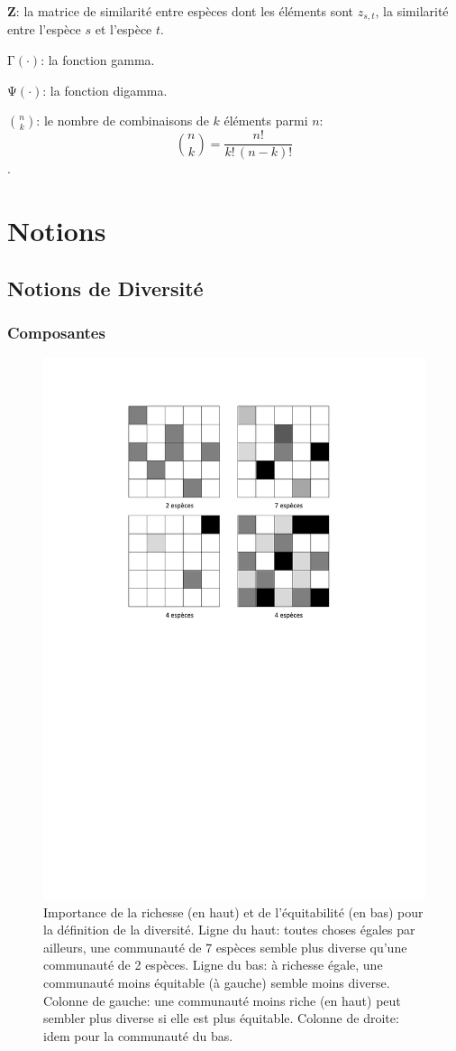 \documentclass[
  11pt,
  french,
  a4paper,
  extrafontsizes,onecolumn,openright
  ]{memoir}
\begin{document}
\noindent \(\mathbf{Z}\): la matrice de similarité entre espèces dont les éléments sont \(z_{s,t}\), la similarité entre l'espèce \(s\) et l'espèce \(t\).

\noindent \(\mathrm{\Gamma}(\cdot)\): la fonction gamma.

\noindent \(\mathrm{\Psi}(\cdot)\): la fonction digamma.

\noindent \(\binom{n}{k}\): le nombre de combinaisons de \(k\) éléments parmi \(n\): \[\binom{n}{k}=\frac{n!}{k!\,(n-k)!}\].

\mainmatter

\part{Notions}\label{part-notions}

\chapter{Notions de Diversité}\label{chap-Notions}

\section{Composantes}\label{composantes}



\scriptsize

\begin{figure}

{\centering \includegraphics[width=0.6\linewidth]{images/Composantes} 

}

\caption{Importance de la richesse (en haut) et de l'équitabilité (en bas) pour la définition de la diversité. Ligne du haut: toutes choses égales par ailleurs, une communauté de 7 espèces semble plus diverse qu'une communauté de 2 espèces. Ligne du bas: à richesse égale, une communauté moins équitable (à gauche) semble moins diverse. Colonne de gauche: une communauté moins riche (en haut) peut sembler plus diverse si elle est plus équitable. Colonne de droite: idem pour la communauté du bas.}\label{fig:Composantes}
\end{figure}
\end{document}
